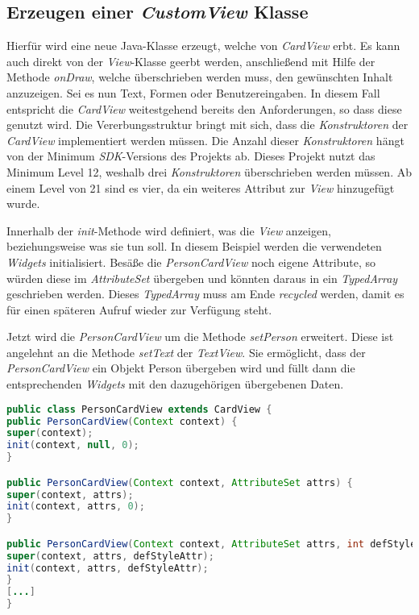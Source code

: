 \newpage

\subsection{Erzeugen einer \textit{CustomView} Klasse}

Hierfür wird eine neue Java-Klasse erzeugt, welche von \textit{CardView} erbt. Es kann auch direkt von der \textit{View}-Klasse geerbt werden, anschließend mit Hilfe der Methode \textit{onDraw}, welche überschrieben werden muss, den gewünschten Inhalt anzuzeigen. Sei es nun Text, Formen oder Benutzereingaben.
In diesem Fall entspricht die \textit{CardView} weitestgehend bereits den Anforderungen, so dass diese genutzt wird.
Die Vererbungsstruktur bringt mit sich, dass die \textit{Konstruktoren} der \textit{CardView} implementiert werden müssen.
Die Anzahl dieser \textit{Konstruktoren} hängt von der Minimum \textit{SDK}-Versions des Projekts ab. Dieses Projekt nutzt das Minimum Level 12, weshalb drei \textit{Konstruktoren} überschrieben werden müssen. Ab einem Level von 21 sind es vier, da ein weiteres Attribut zur \textit{View} hinzugefügt wurde.

Innerhalb der \textit{init}-Methode wird definiert, was die \textit{View} anzeigen, beziehungsweise was sie tun soll. 
In diesem Beispiel werden die verwendeten \textit{Widgets} initialisiert. Besäße die \textit{PersonCardView} noch eigene Attribute, so würden diese im \textit{AttributeSet} übergeben und könnten daraus in ein \textit{TypedArray} geschrieben werden. Dieses \textit{TypedArray} muss am Ende \textit{recycled} werden, damit es für einen späteren Aufruf wieder zur Verfügung steht.

Jetzt wird die \textit{PersonCardView} um die Methode \textit{setPerson} erweitert. Diese ist angelehnt an die Methode \textit{setText} der \textit{TextView}. Sie ermöglicht, dass der \textit{PersonCardView} ein Objekt Person übergeben wird und füllt dann die entsprechenden \textit{Widgets} mit den dazugehörigen übergebenen Daten.

\begin{lstlisting}[label=lst:personCardView,
language=java,
firstnumber=1,
caption=\textit{Konstruktoren} der \textit{PersonCardView}]				  
public class PersonCardView extends CardView {
public PersonCardView(Context context) {
super(context);
init(context, null, 0);
}

public PersonCardView(Context context, AttributeSet attrs) {
super(context, attrs);
init(context, attrs, 0);
}

public PersonCardView(Context context, AttributeSet attrs, int defStyleAttr) {
super(context, attrs, defStyleAttr);
init(context, attrs, defStyleAttr);
}
[...]
}
\end{lstlisting}

